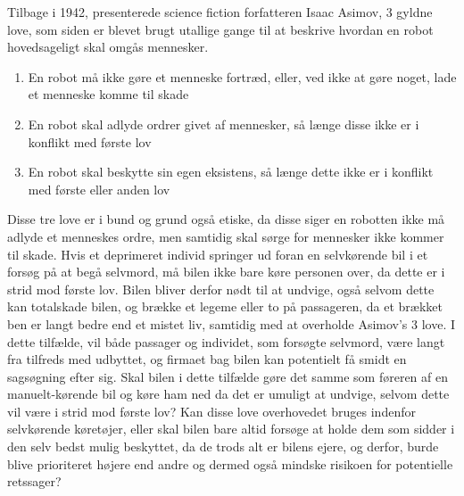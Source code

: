 	Tilbage i 1942, presenterede science fiction forfatteren Isaac Asimov, 3 gyldne love, som siden er blevet brugt utallige gange til at beskrive hvordan en robot hovedsageligt skal omgås mennesker.
	
	\begin{enumerate}
		
		\item En robot må ikke gøre et menneske fortræd, eller, ved ikke at gøre noget, lade et menneske komme til skade
		\item En robot skal adlyde ordrer givet af mennesker, så længe disse ikke er i konflikt med første lov
		\item En robot skal beskytte sin egen eksistens, så længe dette ikke er i konflikt med første eller anden lov
		
	\end{enumerate}
	\cite{Asimov}
	Disse tre love er i bund og grund også etiske, da disse siger en robotten ikke må adlyde et menneskes ordre, men samtidig skal sørge for mennesker ikke kommer til skade. Hvis et deprimeret individ springer ud foran en selvkørende bil i et forsøg på at begå selvmord, må bilen ikke bare køre personen over, da dette er i strid mod første lov. Bilen bliver derfor nødt til at undvige, også selvom dette kan totalskade bilen, og brække et legeme eller to på passageren, da et brækket ben er langt bedre end et mistet liv, samtidig med at overholde Asimov's 3 love. I dette tilfælde, vil både passager og individet, som forsøgte selvmord, være langt fra tilfreds med udbyttet, og firmaet bag bilen kan potentielt få smidt en sagsøgning efter sig. Skal bilen i dette tilfælde gøre det samme som føreren af en manuelt-kørende bil og køre ham ned da det er umuligt at undvige, selvom dette vil være i strid mod første lov? Kan disse love overhovedet bruges indenfor selvkørende køretøjer, eller skal bilen bare altid forsøge at holde dem som sidder i den selv bedst mulig beskyttet, da de trods alt er bilens ejere, og derfor, burde blive prioriteret højere end andre og dermed også mindske risikoen for potentielle retssager? 